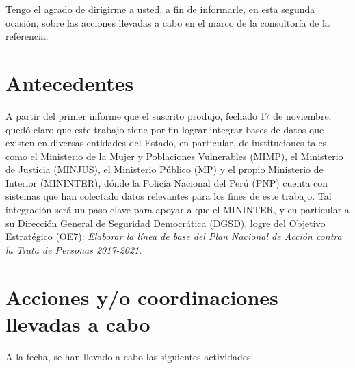 \documentclass[a4paper,12pt]{texMemo}
\begin{document}


\clearpage\maketitle
\thispagestyle{empty}

Tengo el agrado de dirigirme a usted, a fin de informarle, en esta segunda ocasión, sobre las acciones llevadas a cabo en el marco de la consultoría de la referencia. 

\section{Antecedentes}

A partir del primer informe que el suscrito produjo, fechado 17 de noviembre, quedó claro que este trabajo tiene por fin lograr integrar bases de datos que existen en diversas entidades del Estado, en particular, de instituciones tales como el Ministerio de la Mujer y Poblaciones Vulnerables (MIMP), el Ministerio de Justicia (MINJUS), el Ministerio Público (MP) y el propio Ministerio de Interior (MININTER), dónde la Policía Nacional del Perú (PNP) cuenta con sistemas que han colectado datos relevantes para los fines de este trabajo. Tal integración será un paso clave para apoyar a que el MININTER, y en particular a su Dirección General de Seguridad Democrática (DGSD), logre del Objetivo Estratégico  (OE7): \emph{Elaborar la línea de base del Plan Nacional de Acción contra la Trata de Personas 2017-2021}.


\section{Acciones y/o coordinaciones llevadas a cabo}

A la fecha, se han llevado a cabo las siguientes actividades:
\end{document}

